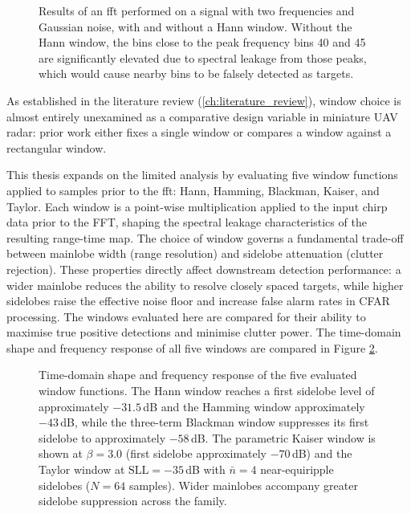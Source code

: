 \begin{figure}[htbp]
    \centering
    
    \caption[FFT with and without a Hann window showing spectral leakage reduction.]{Results of an \gls{fft} performed on a signal with two frequencies and Gaussian noise, with
    and without a Hann window. Without the Hann window, the bins close to the peak frequency bins 40
    and 45 are significantly elevated due to spectral leakage from those peaks, which would cause
    nearby bins to be falsely detected as targets.}
    \label{fig:hann filter}
\end{figure}

As established in the literature review (\ref{ch:literature_review}), window
choice is almost entirely unexamined as a comparative design variable in
miniature UAV radar: prior work either fixes a single window or compares 
a window against a rectangular window. 

This thesis expands on the limited analysis by evaluating five window functions applied to 
samples prior to the \gls{fft}: Hann,
Hamming, Blackman, Kaiser, and Taylor. Each window is a point-wise multiplication applied to the input
chirp data prior to the FFT, shaping the spectral leakage characteristics of the resulting
range-time map. The choice of window governs a fundamental trade-off between mainlobe width
(range resolution) and sidelobe attenuation (clutter rejection). These properties directly
affect downstream detection performance: a wider mainlobe reduces the ability to resolve closely
spaced targets, while higher sidelobes raise the effective noise floor and increase false alarm
rates in CFAR processing. The windows evaluated here are compared for their ability to maximise
true positive detections and minimise clutter power. The time-domain shape and frequency response
of all five windows are compared in Figure \ref{fig:windows_frequency_response}.

\begin{figure}
    \centering
    \caption[Time-domain shape and frequency response of the five window functions.]{Time-domain
    shape and frequency response of the five evaluated window functions. The Hann window reaches a
    first sidelobe level of approximately $-31.5$\,dB and the Hamming window approximately
    $-43$\,dB, while the three-term Blackman window suppresses its first sidelobe to approximately
    $-58$\,dB. The parametric Kaiser window is shown at $\beta = 3.0$ (first sidelobe approximately
    $-70$\,dB) and the Taylor window at $\text{SLL} = -35$\,dB with $\bar{n} = 4$ near-equiripple
    sidelobes ($N = 64$ samples). Wider mainlobes accompany greater sidelobe suppression across
    the family.}
    \label{fig:windows_frequency_response}
\end{figure}

